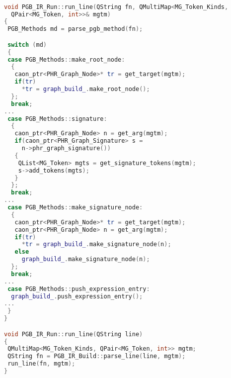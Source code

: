 \begin{lstlisting}[language = C++, numbers = none, 
 caption={Running Hypergraph IR},label={lst:figPGBIR},
    basicstyle = \ttfamily\bfseries\tiny, linewidth = .95\linewidth] 

void PGB_IR_Run::run_line(QString fn, QMultiMap<MG_Token_Kinds, 
  QPair<MG_Token, int>>& mgtm)
{
 PGB_Methods md = parse_pgb_method(fn);

 switch (md)
 {
 case PGB_Methods::make_root_node:
  {
   caon_ptr<PHR_Graph_Node>* tr = get_target(mgtm);
   if(tr)
     *tr = graph_build_.make_root_node();
  };
  break;
...
 case PGB_Methods::signature:
  {
   caon_ptr<PHR_Graph_Node> n = get_arg(mgtm);
   if(caon_ptr<PHR_Graph_Signature> s = 
     n->phr_graph_signature())
   {
    QList<MG_Token> mgts = get_signature_tokens(mgtm);
    s->add_tokens(mgts);
   }
  };
  break;
...
 case PGB_Methods::make_signature_node:
  {
   caon_ptr<PHR_Graph_Node>* tr = get_target(mgtm);
   caon_ptr<PHR_Graph_Node> n = get_arg(mgtm);
   if(tr)
     *tr = graph_build_.make_signature_node(n);
   else
     graph_build_.make_signature_node(n);
  };
  break;
...
 case PGB_Methods::push_expression_entry:
  graph_build_.push_expression_entry();
...
 }
}

void PGB_IR_Run::run_line(QString line)
{
 QMultiMap<MG_Token_Kinds, QPair<MG_Token, int>> mgtm;
 QString fn = PGB_IR_Build::parse_line(line, mgtm);
 run_line(fn, mgtm);
}

\end{lstlisting}
\begin{tikzpicture}[remember picture, overlay, text width=.9\linewidth]

\end{tikzpicture} 
